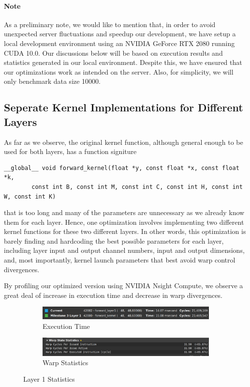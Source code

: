 \documentclass{article}
\begin{document}
\paragraph{Note}
As a preliminary note, we would like to mention that, in order to avoid unexpected server fluctuations and speedup our development,
we have setup a local development environment using an NVIDIA GeForce RTX 2080 running CUDA 10.0. Our discussions below will be based on
execution results and statistics generated in our local environment. Despite this, we have ensured that our optimizations work as
intended on the server. Also, for simplicity, we will only benchmark data size 10000.

\subsection{Seperate Kernel Implementations for Different Layers}
As far as we observe, the original kernel function, although general enough to be used for both layers, has a function signiture
\begin{verbatim}
__global__ void forward_kernel(float *y, const float *x, const float *k,
        const int B, const int M, const int C, const int H, const int W, const int K)
\end{verbatim}
that is too long and many of the parameters are unnecessary as we already know them for each layer. Hence, one optimization involves
implementing two different kernel functions for these two different layers. In other words, this optimization is barely finding and hardcoding
the best possible parameters for each layer, including layer input and output channel numbers, input and output dimensions, and, most importantly,
kernel launch parameters that best avoid warp control divergences.
\par
By profiling our optimized version using NVIDIA Nsight Compute, we observe a great deal of increase in execution time and decrease in
warp divergences.

\begin{figure}[H]
    \centering
    \begin{subfigure}[b]{\linewidth}
        \includegraphics[width=\linewidth]{2kern_layer1_runtime}
        \caption{Execution Time}
    \end{subfigure}
    \begin{subfigure}[b]{\linewidth}
        \includegraphics[width=\linewidth]{2kern_layer1_warp}
        \caption{Warp Statistics}
    \end{subfigure}
    \caption{Layer 1 Statistics}
\end{figure}
\end{document}
